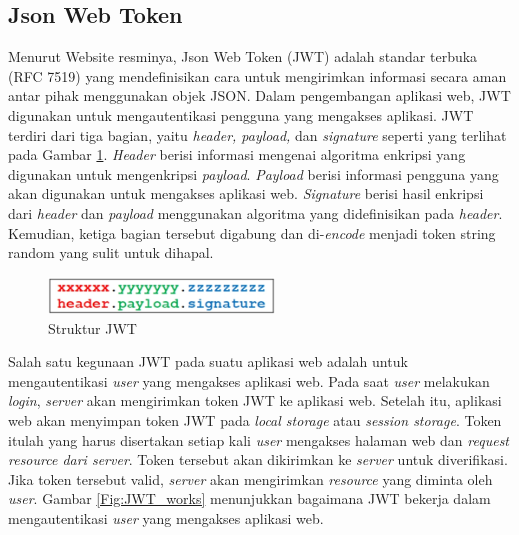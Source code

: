 \subsection{Json Web Token}
Menurut Website resminya, Json Web Token (JWT) adalah standar terbuka (RFC 7519) yang mendefinisikan cara untuk 
mengirimkan informasi secara aman antar pihak menggunakan objek JSON. Dalam pengembangan 
aplikasi web, JWT digunakan untuk mengautentikasi pengguna yang mengakses aplikasi. 
JWT terdiri dari tiga bagian, yaitu \textit{header, payload,} dan \textit{signature} seperti 
yang terlihat pada Gambar \ref{Fig:Struktur_JWT}.
\textit{Header} berisi informasi mengenai algoritma enkripsi yang digunakan untuk mengenkripsi \textit{payload}. 
\textit{Payload} berisi informasi pengguna yang akan digunakan untuk mengakses aplikasi web. 
\textit{Signature} berisi hasil enkripsi dari \textit{header} dan \textit{payload} menggunakan algoritma yang 
didefinisikan pada \textit{header}. Kemudian, ketiga bagian tersebut digabung dan di-\textit{encode} 
menjadi token string random yang sulit untuk dihapal.

\begin{figure}[h]
	\centering
	\includegraphics[width=6cm]{contents/chapter-2/struktur_jwt.jpg}
	\caption{Struktur JWT \cite{rahmatulloh_keamanan_2018}} 
	\label{Fig:Struktur_JWT}
\end{figure}

Salah satu kegunaan JWT pada suatu aplikasi web adalah untuk mengautentikasi \textit{user} yang mengakses aplikasi web. 
Pada saat \textit{user} melakukan \textit{login}, \textit{server} akan mengirimkan token JWT ke aplikasi web. 
Setelah itu, aplikasi web akan menyimpan token JWT pada \textit{local storage} atau \textit{session storage}. 
Token itulah yang harus disertakan setiap kali \textit{user} mengakses halaman web dan \textit{request resource \emph{dari} server}. 
Token tersebut akan dikirimkan ke \textit{server} untuk diverifikasi. Jika token tersebut valid, 
\textit{server} akan mengirimkan \textit{resource} yang diminta oleh \textit{user}. Gambar \ref{Fig:JWT_works} 
menunjukkan bagaimana JWT bekerja dalam mengautentikasi \textit{user} yang mengakses aplikasi web.

